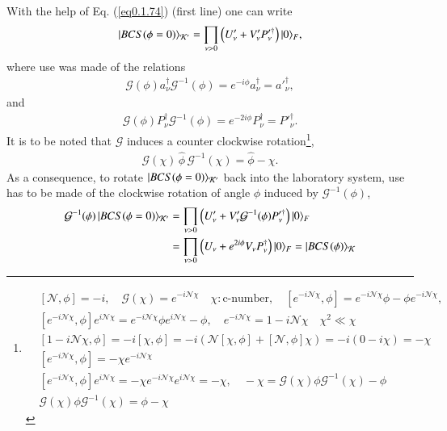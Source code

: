 With the help of Eq. (\ref{eq0.1.74}) (first line) one can write
\begin{align}\label{eq0.1.84}
|{BCS(\phi=0)} \rangle_{\mathcal K'}=\prod_{\nu>0}\left(U'_\nu+V'_\nu P_\nu'^\dagger\right)|{0} \rangle_F,
\end{align}
where use was made of the relations
\begin{align}\label{eq0.1.85}
\mathcal G(\phi)a^\dagger_\nu \mathcal G^{-1}(\phi)=e^{-i\phi}a^\dagger_\nu=a'^\dagger_\nu,
\end{align}
and 
\begin{align}\label{eq0.1.86}
\mathcal G(\phi)P^\dagger_\nu \mathcal G^{-1}(\phi)=e^{-2i\phi}P^\dagger_\nu=P'^\dagger_\nu.
\end{align}
It is to be noted that $\mathcal G$ induces a counter clockwise rotation\footnote{
	\begin{align*}
&[\mathcal N,\phi]=-i,\quad\mathcal G(\chi)=e^{-i\mathcal N\chi}\quad \chi:\text{c-number},\quad[e^{-i\mathcal N\chi},\phi]=e^{-i\mathcal N\chi}\phi-\phi e^{-i\mathcal N\chi},\\
&[e^{-i\mathcal N\chi},\phi]e^{i\mathcal N\chi}=e^{-i\mathcal N\chi}\phi e^{i\mathcal N\chi}-\phi,\quad e^{-i\mathcal N\chi}=1-i\mathcal N\chi\quad \chi^2\ll\chi\\
&[1-i\mathcal N\chi,\phi]=-i[\mathcal\chi,\phi]=-i\left(\mathcal N[\chi,\phi]+[\mathcal N,\phi]\chi\right)=-i(0-i\chi)=-\chi\\
&[e^{-i\mathcal N\chi},\phi]=-\chi e^{-i\mathcal N\chi}\\
&[e^{-i\mathcal N\chi},\phi]e^{i\mathcal N\chi}=-\chi e^{-i\mathcal N\chi}e^{i\mathcal N\chi}=-\chi,\quad -\chi=\mathcal G(\chi)\phi\mathcal G^{-1}(\chi)-\phi\\
&\mathcal G(\chi)\phi\mathcal G^{-1}(\chi)=\phi-\chi
	\end{align*}
},
\begin{align}\label{eq0.1.87}
\mathcal G(\chi)\,\hat\phi\, \mathcal G^{-1}(\chi)=\hat\phi-\chi.
\end{align}
As a consequence, to rotate $|{BCS(\phi=0)} \rangle_{\mathcal K'}$ back into the laboratory system, use has to be made of the clockwise rotation of angle $\phi$ induced by $\mathcal G^{-1}(\phi)$,
\begin{align}\label{eq0.1.88}
\nonumber \mathcal G^{-1}(\phi)\,|{BCS(\phi=0)} \rangle_{\mathcal K'}&=\prod_{\nu>0}\left(U'_\nu+V'_\nu\mathcal G^{-1}(\phi)P'^\dagger_\nu\right)|{0} \rangle_F\\
&=\prod_{\nu>0}\left(U_\nu+e^{2i\phi}V_\nu P^\dagger_\nu\right)|{0} \rangle_F=|{BCS(\phi)} \rangle_{\mathcal K}
\end{align}

